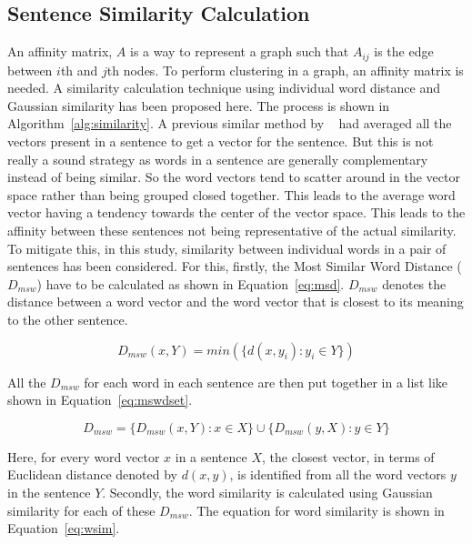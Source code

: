 \subsection{Sentence Similarity Calculation}\label{subsec:sentence-similarity-calculation}
An affinity matrix, $A$ is a way to represent a graph such that $A_{ij}$ is the edge
between $i$th and $j$th nodes.
To perform clustering in a graph, an affinity matrix is needed.
A similarity calculation technique using individual word distance and
Gaussian similarity has been proposed here.
The process is shown in Algorithm~\ref{alg:similarity}.
A previous similar method by \citeauthor{roychowdhury-etal-2022-spectral-base}~\cite{roychowdhury-etal-2022-spectral-base}
had averaged all the vectors present in a sentence to get a vector for the sentence.
But this is not really a sound strategy as words in a sentence are generally complementary instead of being similar.
So the word vectors tend to scatter around in the vector space rather than being grouped closed together.
This leads to the average word vector having a tendency towards the center of the vector space.
This leads to the affinity between these sentences not being representative of the actual similarity.\\

To mitigate this, in this study, similarity between individual words in a pair of sentences has been considered.
For this, firstly, the Most Similar Word Distance ($D_{msw}$) have to be calculated as shown in Equation~\ref{eq:msd}.
$D_{msw}$ denotes the distance between a word vector and the word vector that
is closest to its meaning to the other sentence.

\begin{equation}\label{eq:msd}
    D_{msw}(x,Y) = min(\{d(x,y_i) : y_i \in Y \})
\end{equation}

All the $D_{msw}$ for each word in each sentence are then put together in a list like shown in
Equation~\ref{eq:mswdset}.

\begin{equation}
    D_{msw} = \{D_{msw}(x,Y) : x \in X\} \cup \{D_{msw}(y,X) : y \in Y\}
    \label{eq:mswdset}
\end{equation}

Here, for every word vector $x$ in a sentence $X$, the closest vector, in terms of
Euclidean distance denoted by $d(x,y)$, is identified from all the word vectors $y$ in the sentence $Y$.
Secondly, the word similarity is calculated using Gaussian similarity for each of these $D_{msw}$.
The equation for word similarity is shown in Equation~\ref{eq:wsim}.

